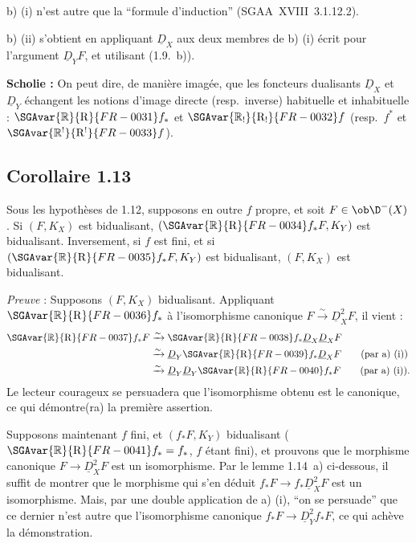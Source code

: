 b) (i) n'est autre que la ``formule d'induction'' (SGAA~XVIII~3.1.12.2).

b) (ii) s'obtient en appliquant $\underline{D}_X$ aux deux membres de b) (i) écrit pour l'argument $\underline{D}_Y F$, et utilisant (1.9.~b)).

\textbf{Scholie :} On peut dire, de manière imagée, que les foncteurs dualisants 
$\underline{D}_X$ et $\underline{D}_Y$
échangent les notions d'image directe (resp.~inverse) habituelle et inhabituelle : $\SGAvar{\mathbb{R}}{\mathrm{R}}{FR-0031} f_{*}$ et $\SGAvar{\mathbb{R}_{!}}{\mathrm{R}_{!}}{FR-0032}f$ (resp.~$f^{*}$ et $\SGAvar{\mathbb{R}^{!}}{\mathrm{R}^{!}}{FR-0033}f$).

\subsection*{Corollaire 1.13}
Sous les hypothèses de 1.12, supposons en outre $f$ propre, et soit $F \in \ob \D^{-}(X)$. Si $(F, K_X)$ est bidualisant, $(\SGAvar{\mathbb{R}}{\mathrm{R}}{FR-0034} f_{*}F, K_Y)$ est bidualisant. Inversement, si $f$ est fini, et si $(\SGAvar{\mathbb{R}}{\mathrm{R}}{FR-0035} f_{*}F, K_Y)$ est bidualisant, $(F, K_X)$ est bidualisant.

\emph{Preuve} : Supposons $(F, K_X)$ bidualisant. Appliquant $\SGAvar{\mathbb{R}}{\mathrm{R}}{FR-0036} f_{*}$ à l'isomorphisme canonique $F \xrightarrow{\sim} \underline{D}_X^{2} F$, il vient :
\begin{align*}
\SGAvar{\mathbb{R}}{\mathrm{R}}{FR-0037} f_{*} F &\xrightarrow{\sim} \SGAvar{\mathbb{R}}{\mathrm{R}}{FR-0038} f_{*} \underline{D}_X \underline{D}_X F \\
&\xrightarrow{\sim} \underline{D}_Y \SGAvar{\mathbb{R}}{\mathrm{R}}{FR-0039} f_{*} \underline{D}_X F \qquad \text{(par a) (i))} \\
&\xrightarrow{\sim} \underline{D}_Y \underline{D}_Y \SGAvar{\mathbb{R}}{\mathrm{R}}{FR-0040} f_{*} F \qquad \text{(par a) (i)).}
\end{align*}
Le lecteur courageux se persuadera que l'isomorphisme obtenu est le canonique, ce qui démontre(ra) la première assertion.

Supposons maintenant $f$ fini, et $(f_{*}F, K_Y)$ bidualisant ($\SGAvar{\mathbb{R}}{\mathrm{R}}{FR-0041} f_{*} = f_{*}$, $f$ étant fini), et prouvons que le morphisme canonique $F \to \underline{D}_X^{2} F$ est un isomorphisme. Par le lemme 1.14~a) ci-dessous, il suffit de montrer que le morphisme qui s'en déduit $f_{*}F \to f_{*}\underline{D}_X^{2} F$ est un isomorphisme. Mais, par une double application de a) (i), ``on se persuade'' que ce dernier n'est autre que l'isomorphisme canonique $f_{*}F \to \underline{D}_Y^{2} f_{*}F$, ce qui achève la démonstration.

